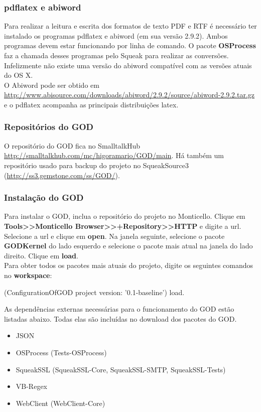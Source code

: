 \subsubsection{pdflatex e abiword}

Para realizar a leitura e escrita dos formatos de texto PDF e RTF é necessário ter instalado os programas pdflatex e abiword (em sua versão 2.9.2).  Ambos programas devem 
estar funcionando por linha de comando. O pacote \textbf{OSProcess} faz a chamada desses programas pelo Squeak para realizar as conversões. Infelizmente não existe uma 
versão do abiword compatível com as versões atuais do OS X.\\

O Abiword pode ser obtido em \url{http://www.abisource.com/downloads/abiword/2.9.2/source/abiword-2.9.2.tar.gz} e o pdflatex acompanha as principais distribuições latex.

\subsubsection{Repositórios do GOD}

O repositório do GOD fica no SmalltalkHub \url{http://smalltalkhub.com/mc/higoramario/GOD/main}. 
Há também um repositório usado para backup do projeto no SqueakSource3 (\url{http://ss3.gemstone.com/ss/GOD/}).

\subsubsection{Instalação do GOD}

Para instalar o GOD, inclua o repositório do projeto no Monticello. Clique em \textbf{Tools>>Monticello Browser>>+Repository>>HTTP} e digite a url. 
Selecione a url e clique em \textbf{open}. Na janela seguinte, selecione o pacote \textbf{GODKernel} do lado esquerdo e selecione o pacote mais atual na janela do lado direito.
Clique em \textbf{load}. \\
Para obter todos os pacotes mais atuais do projeto, digite os seguintes comandos no \textbf{workspace}:\\

\begin{godCode}
(ConfigurationOfGOD project version: '0.1-baseline') load.
\end{godCode}


As dependências externas necessárias para o funcionamento do GOD estão listadas abaixo. Todas elas são incluídas no download dos pacotes do GOD.
\begin{itemize}
 \item JSON
 \item OSProcess (Tests-OSProcess)
 \item SqueakSSL (SqueakSSL-Core, SqueakSSL-SMTP, SqueakSSL-Tests)
 \item VB-Regex
 \item WebClient (WebClient-Core)
\end{itemize}

